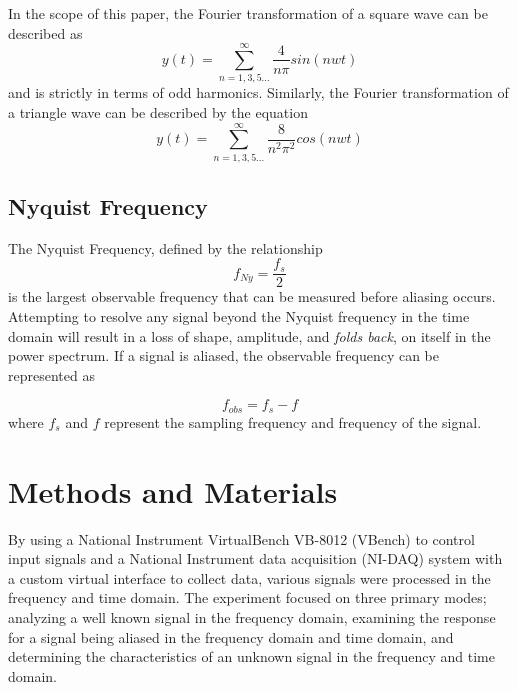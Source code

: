 \documentclass[letterpaper,12pt]{article}
\begin{document}
In the scope of this paper, the Fourier transformation of a square wave can be described as 
\begin{equation}
    y(t) = \sum_{n=1,3,5...}^\infty \frac{4}{n\pi}sin(nwt)
    \label{squareFourierEq}
\end{equation}
and is strictly in terms of odd harmonics. Similarly, the Fourier transformation of a triangle wave can be described by the equation
\begin{equation}
    y(t) = \sum_{n=1,3,5...}^\infty \frac{8}{n^2\pi^2}cos(nwt)
    \label{triangleFourierEq}
\end{equation}

\subsection{Nyquist Frequency}
The Nyquist Frequency, defined by the relationship
\begin{equation}
    f_{Ny} = \frac{f_s}{2}
    \label{NyFreqEq}
\end{equation}
is the largest observable frequency that can be measured before aliasing occurs. Attempting to resolve any signal beyond the Nyquist frequency in the time domain will result in a loss of shape, amplitude, and \emph{folds back}, on itself in the power spectrum. If a signal is aliased, the observable frequency can be represented as

\begin{equation}
    f_{obs} = f_s - f
    \label{fobsEq}
\end{equation}
where $f_s$ and $f$ represent the sampling frequency and frequency of the signal. 



\section{Methods and Materials}
By using a National Instrument VirtualBench VB-8012 (VBench) to control input signals and a National Instrument data acquisition (NI-DAQ) system with a custom virtual interface to collect data, various signals were processed in the frequency and time domain. The experiment focused on three primary modes; analyzing a well known signal in the frequency domain, examining the response for a signal being aliased in the frequency domain and time domain, and determining the characteristics of an unknown signal in the frequency and time domain.
\end{document}
